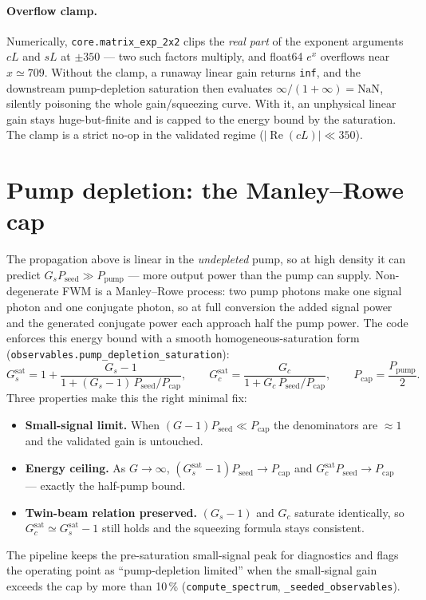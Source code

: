 \documentclass[11pt]{article}
\newcommand{\code}[1]{\texttt{#1}}
\DeclareMathOperator{\Real}{Re}
\begin{document}
\paragraph{Overflow clamp.} Numerically, \code{core.matrix\_exp\_2x2} clips the
\emph{real part} of the exponent arguments $cL$ and $sL$ at $\pm350$ --- two such
factors multiply, and float64 $e^{x}$ overflows near $x\simeq709$. Without the
clamp, a runaway linear gain returns \code{inf}, and the downstream
pump-depletion saturation then evaluates $\infty/(1+\infty)=\text{NaN}$,
silently poisoning the whole gain/squeezing curve. With it, an unphysical linear
gain stays huge-but-finite and is capped to the energy bound by the saturation.
The clamp is a strict no-op in the validated regime ($|\Real(cL)|\ll350$).

\section{Pump depletion: the Manley--Rowe cap}

The propagation above is linear in the \emph{undepleted} pump, so at high density
it can predict $G_s P_{\text{seed}}\gg P_{\text{pump}}$ --- more output power than
the pump can supply. Non-degenerate FWM is a Manley--Rowe process: two pump photons
make one signal photon and one conjugate photon, so at full conversion the added
signal power and the generated conjugate power each approach half the pump power.
The code enforces this energy bound with a smooth homogeneous-saturation form
(\code{observables.pump\_depletion\_saturation}):
\begin{equation}
G_s^{\text{sat}}=1+\frac{G_s-1}{1+(G_s-1)\,P_{\text{seed}}/P_{\text{cap}}},
\qquad
G_c^{\text{sat}}=\frac{G_c}{1+G_c\,P_{\text{seed}}/P_{\text{cap}}},
\qquad
P_{\text{cap}}=\frac{P_{\text{pump}}}{2}.
\label{eq:manleyrowe}
\end{equation}
Three properties make this the right minimal fix:
\begin{itemize}[leftmargin=1.6em]
  \item \textbf{Small-signal limit.} When $(G-1)P_{\text{seed}}\ll P_{\text{cap}}$
  the denominators are $\approx1$ and the validated gain is untouched.
  \item \textbf{Energy ceiling.} As $G\to\infty$, $(G_s^{\text{sat}}-1)P_{\text{seed}}\to
  P_{\text{cap}}$ and $G_c^{\text{sat}}P_{\text{seed}}\to P_{\text{cap}}$ --- exactly the
  half-pump bound.
  \item \textbf{Twin-beam relation preserved.} $(G_s-1)$ and $G_c$ saturate
  identically, so $G_c^{\text{sat}}\simeq G_s^{\text{sat}}-1$ still holds and the
  squeezing formula stays consistent.
\end{itemize}
The pipeline keeps the pre-saturation small-signal peak for diagnostics and flags
the operating point as ``pump-depletion limited'' when the small-signal gain
exceeds the cap by more than 10\,\% (\code{compute\_spectrum},
\code{\_seeded\_observables}).
\end{document}
